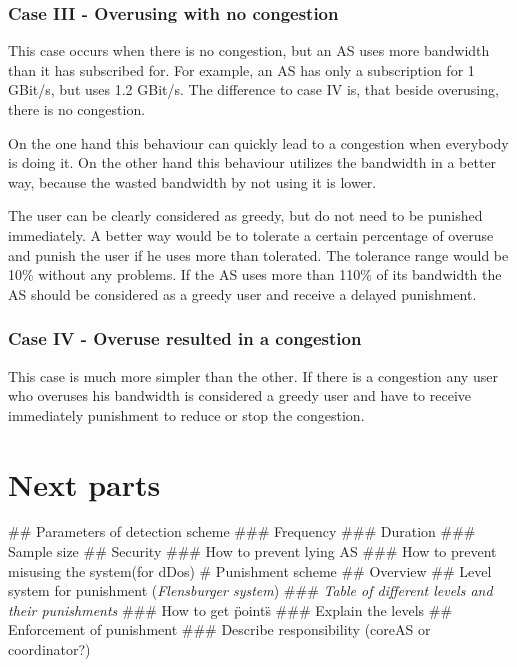 \documentclass[thesis.tex]{subfiles}
\begin{document}

\subsubsection{Case III - Overusing with no congestion}
This case occurs when there is no congestion, but an AS uses more bandwidth than it has subscribed for. For example, an AS has only a subscription for 1 GBit/s, but uses 1.2 GBit/s. The difference to case IV is, that beside overusing, there is no congestion.

On the one hand this behaviour can quickly lead to a congestion when everybody is doing it. On the other hand this behaviour utilizes the bandwidth in a better way, because the wasted bandwidth by not using it is lower.

The user can be clearly considered as greedy, but do not need to be punished immediately. A better way would be to tolerate a certain percentage of overuse and punish the user if he uses more than tolerated. The tolerance range would be 10\% without any problems. If the AS uses more than 110\% of its bandwidth the AS should be considered as a greedy user and receive a delayed punishment.


\subsubsection{Case IV - Overuse resulted in a congestion}
This case is much more simpler than the other. If there is a congestion any user who overuses his bandwidth is considered a greedy user and have to receive immediately punishment to reduce or stop the congestion. 

\section{Next parts}
\begin{easylist}
    \MyListProperties
        ## Parameters of detection scheme
        ### Frequency
        ### Duration
        ### Sample size
        ## Security
        ### How to prevent lying AS
        ### How to prevent misusing the system(for dDos)
        # Punishment scheme
        ## Overview
        ## Level system for punishment (\textit{Flensburger system})
        ### \textit{Table of different levels and their punishments}
        ### How to get \"points\"
        ### Explain the levels
        ## Enforcement of punishment
        ### Describe responsibility (coreAS or coordinator?)
    \end{easylist}
\subfilebib %
\end{document}
